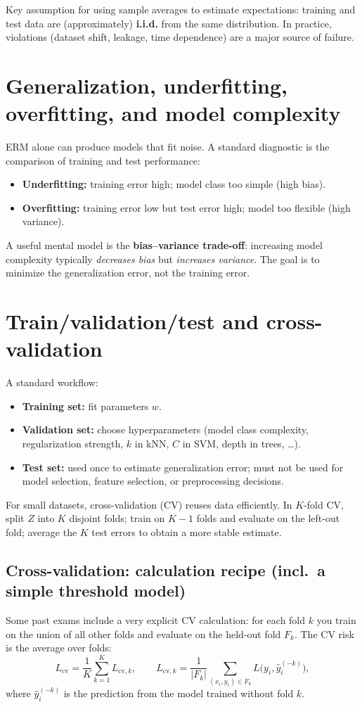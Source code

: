 \documentclass[11pt, oneside]{book}
\newcommand{\1}{\ind}                       %
\begin{document}
Key assumption for using sample averages to estimate expectations: training and test data are (approximately) \textbf{i.i.d.} from the same distribution. In practice, violations (dataset shift, leakage, time dependence) are a major source of failure.

\section{Generalization, underfitting, overfitting, and model complexity}
ERM alone can produce models that fit noise.
A standard diagnostic is the comparison of training and test performance:
\begin{itemize}
  \item \textbf{Underfitting:} training error high; model class too simple (high bias).
  \item \textbf{Overfitting:} training error low but test error high; model too flexible (high variance).
\end{itemize}

A useful mental model is the \textbf{bias--variance trade-off}: increasing model complexity typically \emph{decreases bias} but \emph{increases variance}. The goal is to minimize the generalization error, not the training error.

\section{Train/validation/test and cross-validation}
A standard workflow:
\begin{itemize}
  \item \textbf{Training set:} fit parameters $w$.
  \item \textbf{Validation set:} choose hyperparameters (model class complexity, regularization strength, $k$ in kNN, $C$ in SVM, depth in trees, \dots).
  \item \textbf{Test set:} used once to estimate generalization error; must not be used for model selection, feature selection, or preprocessing decisions.
\end{itemize}

For small datasets, cross-validation (CV) reuses data efficiently.
In $K$-fold CV, split $Z$ into $K$ disjoint folds; train on $K-1$ folds and evaluate on the left-out fold; average the $K$ test errors to obtain a more stable estimate.

\subsection{Cross-validation: calculation recipe (incl.\ a simple threshold model)}
Some past exams include a very explicit CV calculation: for each fold $k$ you train on the union of all other folds and
evaluate on the held-out fold $F_k$. The CV risk is the average over folds:
\[
L_{\mathrm{cv}}=\frac{1}{K}\sum_{k=1}^K L_{\mathrm{cv},k},\qquad
L_{\mathrm{cv},k}=\frac{1}{|F_k|}\sum_{(x_i,y_i)\in F_k} L\big(y_i,\hat y_i^{(-k)}\big),
\]
where $\hat y_i^{(-k)}$ is the prediction from the model trained without fold $k$.
\end{document}
